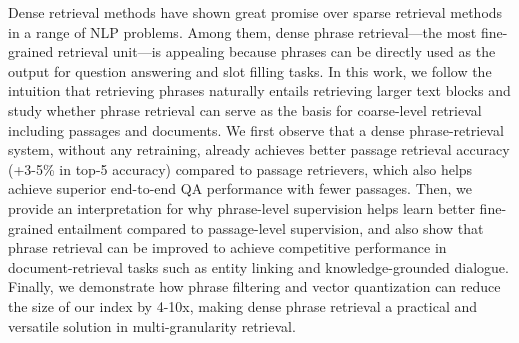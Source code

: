 Dense retrieval methods have shown great promise over sparse retrieval methods in a range of NLP problems. Among them, dense phrase retrieval—the most fine-grained retrieval unit—is appealing because phrases can be directly used as the output for question answering and slot filling tasks. In this work, we follow the intuition that retrieving phrases naturally entails retrieving larger text blocks and study whether phrase retrieval can serve as the basis for coarse-level retrieval including passages and documents. We first observe that a dense phrase-retrieval system, without any retraining, already achieves better passage retrieval accuracy (+3-5\% in top-5 accuracy) compared to passage retrievers, which also helps achieve superior end-to-end QA performance with fewer passages. Then, we provide an interpretation for why phrase-level supervision helps learn better fine-grained entailment compared to passage-level supervision, and also show that phrase retrieval can be improved to achieve competitive performance in document-retrieval tasks such as entity linking and knowledge-grounded dialogue. Finally, we demonstrate how phrase filtering and vector quantization can reduce the size of our index by 4-10x, making dense phrase retrieval a practical and versatile solution in multi-granularity retrieval.
